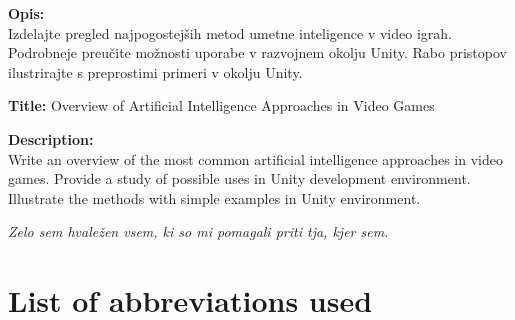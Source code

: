 \documentclass[a4paper,12pt,openright]{book}
\newcommand{\ttitleEn}{Overview of Artificial Intelligence Approaches in Video Games}
\newcommand{\clearemptydoublepage}{\newpage{\pagestyle{empty}\cleardoublepage}}
\begin{document}
\bigskip
\noindent\textbf{Opis:}\\
Izdelajte pregled najpogostejših metod umetne inteligence v video igrah. Podrobneje preučite možnosti uporabe v razvojnem okolju Unity. Rabo pristopov ilustrirajte s preprostimi primeri v okolju Unity.

\bigskip
\noindent\textbf{Title:} \ttitleEn

\bigskip
\noindent\textbf{Description:}\\
Write an overview of the most common artificial intelligence approaches in video games. Provide a study of possible uses in Unity development environment. Illustrate the methods with simple examples in Unity environment.

\vfill

\vspace{2cm}

\clearemptydoublepage

\thispagestyle{empty}\mbox{}\vfill\null\it%
\noindent
Zelo sem hvaležen vsem, ki so mi pomagali priti tja, kjer sem.
\rm\normalfont

\clearemptydoublepage





\pagestyle{empty}
\def\thepage{}%
\tableofcontents{}


\clearemptydoublepage



\chapter*{List of abbreviations used}  %
\end{document}
